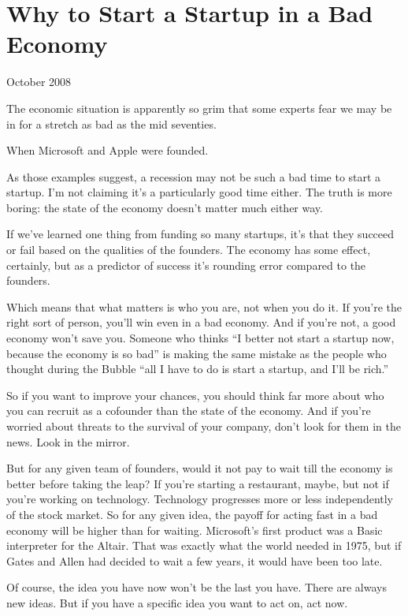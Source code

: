 \chapter{Why to Start a Startup in a Bad Economy}

October 2008

The economic situation is apparently so grim that some experts fear we
may be in for a stretch as bad as the mid seventies.

When Microsoft and Apple were founded.

As those examples suggest, a recession may not be such a bad time to
start a startup. I'm not claiming it's a particularly good time either.
The truth is more boring: the state of the economy doesn't matter much
either way.

If we've learned one thing from funding so many startups, it's that they
succeed or fail based on the qualities of the founders. The economy has
some effect, certainly, but as a predictor of success it's rounding
error compared to the founders.

Which means that what matters is who you are, not when you do it. If
you're the right sort of person, you'll win even in a bad economy. And
if you're not, a good economy won't save you. Someone who thinks ``I
better not start a startup now, because the economy is so bad'' is
making the same mistake as the people who thought during the Bubble
``all I have to do is start a startup, and I'll be rich.''

So if you want to improve your chances, you should think far more about
who you can recruit as a cofounder than the state of the economy. And if
you're worried about threats to the survival of your company, don't look
for them in the news. Look in the mirror.

But for any given team of founders, would it not pay to wait till the
economy is better before taking the leap? If you're starting a
restaurant, maybe, but not if you're working on technology. Technology
progresses more or less independently of the stock market. So for any
given idea, the payoff for acting fast in a bad economy will be higher
than for waiting. Microsoft's first product was a Basic interpreter for
the Altair. That was exactly what the world needed in 1975, but if Gates
and Allen had decided to wait a few years, it would have been too late.

Of course, the idea you have now won't be the last you have. There are
always new ideas. But if you have a specific idea you want to act on,
act now.

